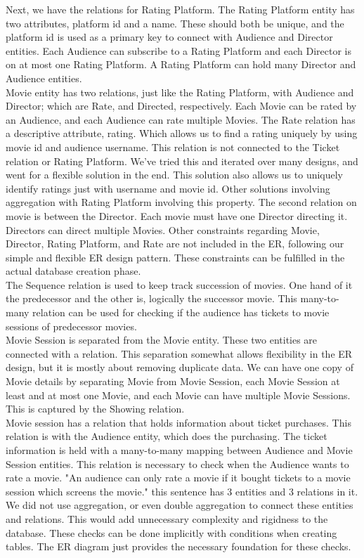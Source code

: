 \documentclass[12pt, A4, titlepage]{article}
\begin{document}
Next, we have the relations for Rating Platform. The Rating Platform entity has two attributes, platform id and a name. These should both be unique, and the platform id is used as a primary key to connect with Audience and Director entities. Each Audience can subscribe to a Rating Platform and each Director is on at most one Rating Platform. A Rating Platform can hold many Director and Audience entities. \\

Movie entity has two relations, just like the Rating Platform, with Audience and Director; which are Rate, and Directed, respectively. Each Movie can be rated by an Audience, and each Audience can rate multiple Movies. The Rate relation has a descriptive attribute, rating. Which allows us to find a rating uniquely by using movie id and audience username. This relation is not connected to the Ticket relation or Rating Platform. We've tried this and iterated over many designs, and went for a flexible solution in the end. This solution also allows us to uniquely identify ratings just with username and movie id. Other solutions involving aggregation with Rating Platform involving this property. The second relation on movie is between the Director. Each movie must have one Director directing it. Directors can direct multiple Movies. Other constraints regarding Movie, Director, Rating Platform, and Rate are not included in the ER, following our simple and flexible ER design pattern. These constraints can be fulfilled in the actual database creation phase. \\

The Sequence relation is used to keep track succession of movies. One hand of it the predecessor and the other is, logically the successor movie. This many-to-many relation can be used for checking if the audience has tickets to movie sessions of predecessor movies. \\

Movie Session is separated from the Movie entity. These two entities are connected with a relation. This separation somewhat allows flexibility in the ER design, but it is mostly about removing duplicate data. We can have one copy of Movie details by separating Movie from Movie Session, each Movie Session at least and at most one Movie, and each Movie can have multiple Movie Sessions. This is captured by the Showing relation. \\

Movie session has a relation that holds information about ticket purchases. This relation is with the Audience entity, which does the purchasing. The ticket information is held with a many-to-many mapping between Audience and Movie Session entities. This relation is necessary to check when the Audience wants to rate a movie. "An audience can only rate a movie if it bought tickets to a movie session which screens the movie." this sentence has 3 entities and 3 relations in it. We did not use aggregation, or even double aggregation to connect these entities and relations. This would add unnecessary complexity and rigidness to the database. These checks can be done implicitly with conditions when creating tables. The ER diagram just provides the necessary foundation for these checks. \\
\end{document}
